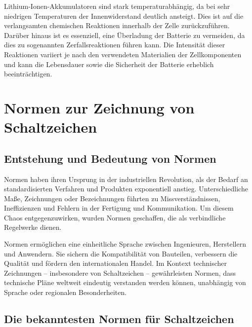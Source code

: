 Lithium-Ionen-Akkumulatoren sind stark temperaturabhängig, da bei sehr niedrigen Temperaturen der Innenwiderstand deutlich ansteigt. Dies ist auf die verlangsamten chemischen Reaktionen innerhalb der Zelle zurückzuführen. Darüber hinaus ist es essenziell, eine Überladung der Batterie zu vermeiden, da dies zu sogenannten Zerfallsreaktionen führen kann. Die Intensität dieser Reaktionen variiert je nach den verwendeten Materialien der Zellkomponenten und kann die Lebensdauer sowie die Sicherheit der Batterie erheblich beeinträchtigen. \autocite[S. 15f.]{Korthauer.2013}


\section{Normen zur Zeichnung von Schaltzeichen}

\subsection*{Entstehung und Bedeutung von Normen}
Normen haben ihren Ursprung in der industriellen Revolution, als der Bedarf an standardisierten Verfahren und Produkten exponentiell anstieg. Unterschiedliche Maße, Zeichnungen oder Bezeichnungen führten zu Missverständnissen, Ineffizienzen und Fehlern in der Fertigung und Kommunikation. Um diesem Chaos entgegenzuwirken, wurden Normen geschaffen, die als verbindliche Regelwerke dienen.

Normen ermöglichen eine einheitliche Sprache zwischen Ingenieuren, Herstellern und Anwendern. Sie sichern die Kompatibilität von Bauteilen, verbessern die Qualität und fördern den internationalen Handel. Im Kontext technischer Zeichnungen – insbesondere von Schaltzeichen – gewährleisten Normen, dass technische Pläne weltweit eindeutig verstanden werden können, unabhängig von Sprache oder regionalen Besonderheiten.

\subsection*{Die bekanntesten Normen für Schaltzeichen}

